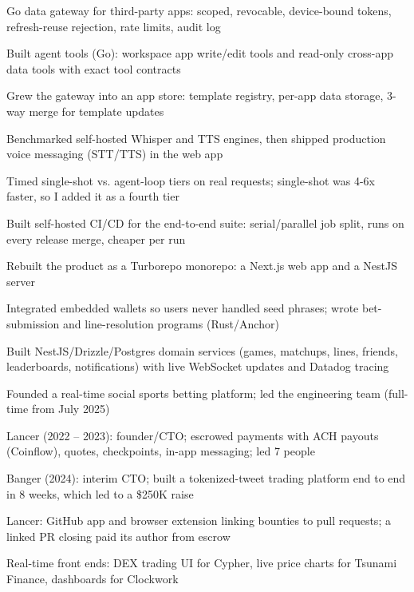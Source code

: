 \documentclass[print]{jack-resume}
\begin{document}
\begin{tightemize}
    \item Go data gateway for third-party apps: scoped, revocable, device-bound tokens, refresh-reuse rejection, rate limits, audit log
    \item Built agent tools (Go): workspace app write/edit tools and read-only cross-app data tools with exact tool contracts
    \item Grew the gateway into an app store: template registry, per-app data storage, 3-way merge for template updates
    \item Benchmarked self-hosted Whisper and TTS engines, then shipped production voice messaging (STT/TTS) in the web app
    \item Timed single-shot vs. agent-loop tiers on real requests; single-shot was 4-6x faster, so I added it as a fourth tier
    \item Built self-hosted CI/CD for the end-to-end suite: serial/parallel job split, runs on every release merge, cheaper per run
\end{tightemize}
\sectionsep

\begin{tightemize}
    \item Rebuilt the product as a Turborepo monorepo: a Next.js web app and a NestJS server
    \item Integrated embedded wallets so users never handled seed phrases; wrote bet-submission and line-resolution programs (Rust/Anchor)
    \item Built NestJS/Drizzle/Postgres domain services (games, matchups, lines, friends, leaderboards, notifications) with live WebSocket updates and Datadog tracing
    \item Founded a real-time social sports betting platform; led the engineering team (full-time from July 2025)
\end{tightemize}
\sectionsep

\begin{tightemize}
    \item Lancer (2022 -- 2023): founder/CTO; escrowed payments with ACH payouts (Coinflow), quotes, checkpoints, in-app messaging; led 7 people
    \item Banger (2024): interim CTO; built a tokenized-tweet trading platform end to end in 8 weeks, which led to a \$250K raise
    \item Lancer: GitHub app and browser extension linking bounties to pull requests; a linked PR closing paid its author from escrow
    \item Real-time front ends: DEX trading UI for Cypher, live price charts for Tsunami Finance, dashboards for Clockwork
\end{tightemize}
\sectionsep
\end{document}
